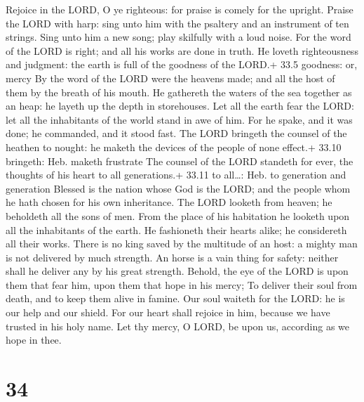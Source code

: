  Rejoice in the LORD, O ye righteous: for praise is comely
for the upright.  Praise the LORD with harp: sing unto him
with the psaltery and an instrument of ten strings.  Sing
unto him a new song; play skilfully with a loud noise.  For
the word of the LORD is right; and all his works are done in truth.
 He loveth righteousness and judgment: the earth is full of
the goodness of the LORD.+ 33.5 goodness: or, mercy  By the
word of the LORD were the heavens made; and all the host of them by the
breath of his mouth.  He gathereth the waters of the sea
together as an heap: he layeth up the depth in storehouses. 
Let all the earth fear the LORD: let all the inhabitants of the world
stand in awe of him.  For he spake, and it was done; he
commanded, and it stood fast.  The LORD bringeth the
counsel of the heathen to nought: he maketh the devices of the people of
none effect.+ 33.10 bringeth: Heb. maketh frustrate  The
counsel of the LORD standeth for ever, the thoughts of his heart to all
generations.+ 33.11 to all\ldots: Heb. to generation and generation
 Blessed is the nation whose God is the LORD; and the
people whom he hath chosen for his own inheritance.  The
LORD looketh from heaven; he beholdeth all the sons of men.
 From the place of his habitation he looketh upon all the
inhabitants of the earth.  He fashioneth their hearts
alike; he considereth all their works.  There is no king
saved by the multitude of an host: a mighty man is not delivered by much
strength.  An horse is a vain thing for safety: neither
shall he deliver any by his great strength.  Behold, the
eye of the LORD is upon them that fear him, upon them that hope in his
mercy;  To deliver their soul from death, and to keep them
alive in famine.  Our soul waiteth for the LORD: he is our
help and our shield.  For our heart shall rejoice in him,
because we have trusted in his holy name.  Let thy mercy, O
LORD, be upon us, according as we hope in thee.

\hypertarget{section-33}{%
\section{34}\label{section-33}}

